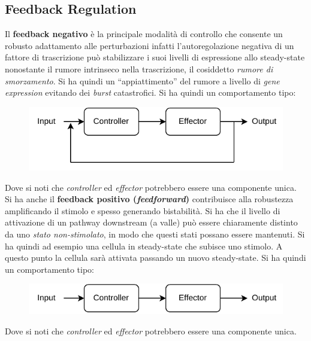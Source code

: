 \documentclass[a4paper,12pt, oneside]{book}
\begin{document}
\subsection{Feedback Regulation}
Il \textbf{feedback negativo} è la principale modalità di controllo che consente
un robusto adattamento alle perturbazioni infatti l'autoregolazione negativa di
un fattore di trascrizione può stabilizzare i suoi livelli di espressione allo
steady-state nonostante il rumore intrinseco nella trascrizione, il
cosiddetto \textit{rumore di smorzamento}. Si ha quindi un ``appiattimento'' del
rumore a livello di \textit{gene expression} evitando dei \textit{burst}
catastrofici. Si ha quindi un comportamento tipo:
\begin{figure}[H]
  \centering
  \includegraphics[scale = 1]{img/negfeed.pdf}
\end{figure}
Dove si noti che \textit{controller} ed \textit{effector} potrebbero essere una
componente unica.\\
Si ha anche il \textbf{feedback positivo (\textit{feedforward})} contribuisce
alla robustezza amplificando il stimolo e spesso generando bistabilità. Si ha
che il livello di attivazione di un pathway downstream (a valle) può essere
chiaramente distinto da uno \textit{stato non-stimolato},
in modo che questi stati possano essere mantenuti. Si ha quindi ad esempio una
cellula in steady-state che subisce uno stimolo. A questo punto la cellula sarà
attivata passando un nuovo steady-state. Si ha quindi un comportamento tipo:
\begin{figure}[H]
  \centering
  \includegraphics[scale = 1]{img/posfeed.pdf}
\end{figure}
Dove si noti che \textit{controller} ed \textit{effector} potrebbero essere una
componente unica.
\end{document}
